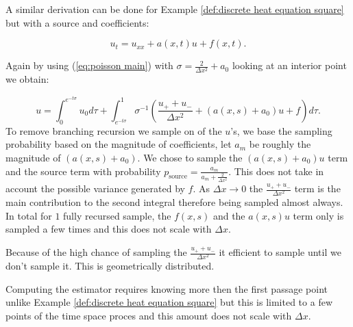 \documentclass[a4paper,12pt]{article}
\begin{document}
\begin{example} \label{ex:semi heat source}

  A similar derivation can be done for Example \ref{def:discrete heat equation square}
  but with a source and coefficients:

  \begin{equation}
    u_{t} = u_{xx} + a(x,t)u + f(x,t)
    .
  \end{equation}

  Again by using (\ref{eq:poisson main}) with $\sigma = \frac{2}{\Delta x^{2}} +a_{0}$
  looking at an interior point we obtain:

  \begin{equation}
    u =
    \int_{0}^{e^{-t \sigma }} u_{0} d\tau  + \int_{e^{-t \sigma }}^{1}
    \sigma^{-1}
    \left(
    \frac{u_{+} + u_{-}}{\Delta x^{2}} +(a(x,s)+ a_{0}) u+ f
    \right)
    d\tau
    .
  \end{equation}
  To remove branching recursion we sample on of the $u$'s, we base the sampling
  probability based on the magnitude of coefficients, let $a_m$ be roughly the magnitude of
  $(a(x,s)+ a_{0})$. We chose to sample the $(a(x,s)+ a_{0})u$ term and the source term
  with probability $p_{\text{source}} = \frac{a_m}{a_m + \frac{2}{\Delta x^{2}}}$. This does not take in account
  the possible variance generated by $f$.
  As $\Delta x \rightarrow 0$ the $\frac{u_{+} + u_{-}}{\Delta x^{2}}$ term is
  the main contribution to the second integral therefore
  being sampled almost always.
  In total for $1$ fully recursed sample,
  the $f(x,s)$ and the $a(x,s)u$ term only
  is sampled a few times and this does not scale with $\Delta x$.
\end{example}

\begin{julia}\label{jl:point estimator heat source}
  Because of the high chance of sampling the $\frac{u_{+} + u_{-}}{\Delta x^{2}}$ it efficient
  to sample until we don't sample it. This is geometrically distributed.

\end{julia}

Computing the estimator requires knowing more then the first passage point
unlike Example \ref{def:discrete heat equation square} but this is limited
to a few points of the time space proces and this amount does not scale with $\Delta x$.
\end{document}
